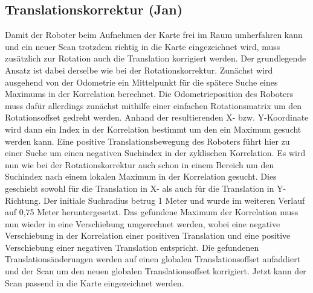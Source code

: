 \subsection{Translationskorrektur (Jan)}

Damit der Roboter beim Aufnehmen der Karte frei im Raum umherfahren kann und ein neuer Scan trotzdem richtig in die Karte eingezeichnet wird, muss zusätzlich zur Rotation auch die Translation korrigiert werden. Der grundlegende Ansatz ist dabei derselbe wie bei der Rotationskorrektur. Zunächst wird ausgehend von der Odometrie ein Mittelpunkt für die spätere Suche eines Maximums in der Korrelation berechnet. Die Odometrieposition des Roboters muss dafür allerdings zunächst mithilfe einer einfachen Rotationsmatrix um den Rotationsoffset gedreht werden. Anhand der resultierenden X- bzw. Y-Koordinate wird dann ein Index in der Korrelation bestimmt um den ein Maximum gesucht werden kann. Eine positive Translationsbewegung des Roboters führt hier zu einer Suche um einen negativen Suchindex in der zyklischen Korrelation.
Es wird nun wie bei der Rotationskorrektur auch schon in einem Bereich um den Suchindex nach einem lokalen Maximum in der Korrelation gesucht. Dies geschieht sowohl für die Translation in X- als auch für die Translation in Y-Richtung. Der initiale Suchradius betrug 1 Meter und wurde im weiteren Verlauf auf 0,75 Meter heruntergesetzt.
Das gefundene Maximum der Korrelation muss nun wieder in eine Verschiebung umgerechnet werden, wobei eine negative Verschiebung in der Korrelation einer positiven Translation und eine positive Verschiebung einer negativen Translation entspricht.
Die gefundenen Translationsänderungen werden auf einen globalen Translationsoffset aufaddiert und der Scan um den neuen globalen Translationsoffset korrigiert.
Jetzt kann der Scan passend in die Karte eingezeichnet werden.